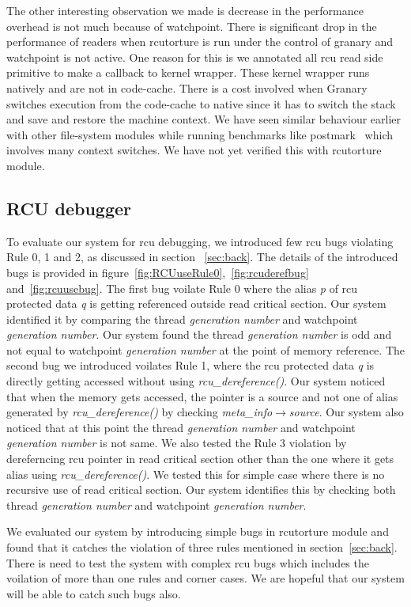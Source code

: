 The other interesting observation we made is decrease in the performance overhead is not much because of watchpoint. There is significant drop in the performance of readers when rcutorture is run under the control of granary and watchpoint is not active. One reason for this is we annotated all rcu read side primitive to make a callback to kernel wrapper. These kernel wrapper runs natively and are not in code-cache. There is a cost involved when Granary switches execution from the code-cache to native since it has to switch the stack and save and restore the machine context. We have seen similar behaviour earlier with other file-system modules while running benchmarks like postmark~\cite{katcher97postmark} which involves many context switches. We have not yet verified this with rcutorture module.


\subsection {RCU debugger}
To evaluate our system for rcu debugging, we introduced few rcu bugs violating Rule 0, 1 and 2, as discussed in section ~\ref{sec:back}. The details of the introduced bugs is provided in figure~\ref{fig:RCUuseRule0},~\ref{fig:rcuderefbug} and~\ref{fig:rcuusebug}. The first bug voilate Rule 0 where the alias \emph{p} of rcu protected data \emph{q} is getting referenced outside read critical section. Our system identified it by comparing the thread \emph{generation number} and watchpoint \emph{generation number}. Our system found the thread \emph{generation number} is odd and not equal to watchpoint \emph{generation number} at the point of memory reference. The second bug we introduced voilates Rule 1, where the rcu protected data \emph{q} is directly getting accessed without using \emph{rcu\_dereference()}. Our system noticed that when the memory gets accessed, the pointer is a source and not one of  alias generated by \emph{rcu\_dereference()} by checking \emph{meta\_info$\rightarrow$source}. Our system also noticed that at this point the thread \emph{generation number} and watchpoint \emph{generation number} is not same. We also tested the Rule 3 violation by dereferncing rcu pointer in read critical section other than the one where it gets alias using \emph{rcu\_dereference()}. We tested this for simple case where there is no recursive use of read critical section. Our system identifies this by checking both thread \emph{generation number} and watchpoint \emph{generation number}. 

We evaluated our system by introducing simple bugs in rcutorture module and found that it catches the violation of three rules mentioned in section~\ref{sec:back}. There is need to test the system with complex rcu bugs which includes the voilation of more than one rules and corner cases. We are hopeful that our system will be able to catch such bugs also.


